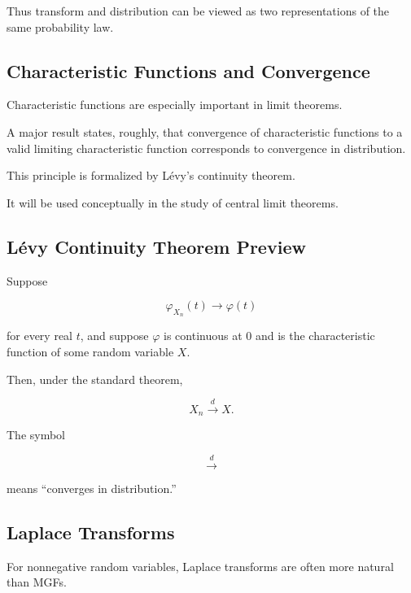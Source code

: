 Thus transform and distribution can be viewed as two representations of
the same probability law.

\subsection{Characteristic Functions and Convergence}
\label{subsec:cf-convergence-preview}

Characteristic functions are especially important in limit theorems.

A major result states, roughly, that convergence of characteristic
functions to a valid limiting characteristic function corresponds to
convergence in distribution.

This principle is formalized by Lévy's continuity theorem.

It will be used conceptually in the study of central limit theorems.

\subsection{Lévy Continuity Theorem Preview}
\label{subsec:levy-continuity-preview}

Suppose

\[
\varphi_{X_n}(t)
\to
\varphi(t)
\]

for every real \(t\), and suppose \(\varphi\) is continuous at \(0\) and
is the characteristic function of some random variable \(X\).

Then, under the standard theorem,

\[
\boxed{
X_n
\xrightarrow{d}
X.
}
\]

The symbol

\[
\xrightarrow{d}
\]

means ``converges in distribution.''

\subsection{Laplace Transforms}
\label{subsec:laplace-transforms-probability}

For nonnegative random variables, Laplace transforms are often more
natural than MGFs.

